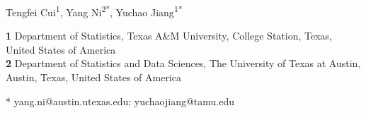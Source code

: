 \vspace*{0.2in}
\begin{flushleft}
{\Large\textbf{\ManuscriptTitle}\par}
\bigskip


Tengfei Cui\textsuperscript{1},
Yang Ni\textsuperscript{2*},
Yuchao Jiang\textsuperscript{1*}
\\
\bigskip

\textbf{1} Department of Statistics, Texas A\&M University, College Station, Texas, United States of America
\\
\textbf{2} Department of Statistics and Data Sciences, The University of Texas at Austin, Austin, Texas, United States of America
\\
\bigskip

* yang.ni@austin.utexas.edu; yuchaojiang@tamu.edu

\end{flushleft}


